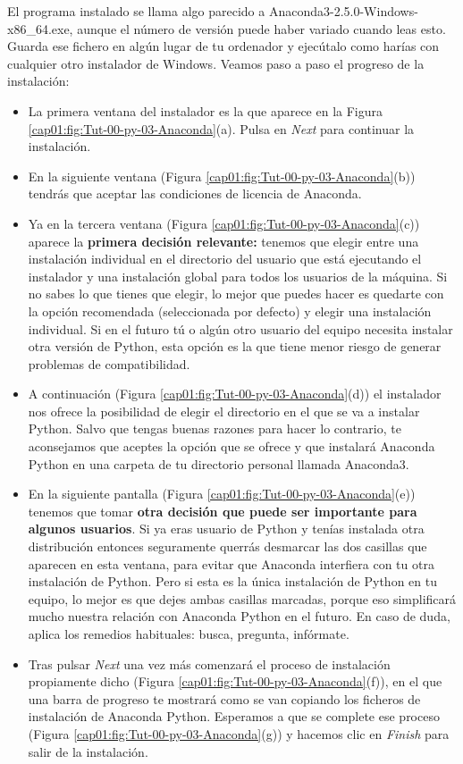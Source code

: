 \documentclass[10pt,a4paper]{article}\usepackage[]{graphicx}\usepackage[]{color}
\newcounter {cont01}
\begin{document}
El programa instalado se llama algo parecido a {\sf Anaconda3-2.5.0-Windows-x86\_64.exe}, aunque el número de versión puede haber variado cuando leas esto. Guarda ese fichero en algún lugar de tu ordenador y ejecútalo como harías con cualquier otro instalador de Windows. Veamos paso a paso el progreso de la instalación: 
\begin{itemize}
  \item La primera ventana del instalador es la que aparece en la Figura \ref{cap01:fig:Tut-00-py-03-Anaconda}(a). Pulsa en {\em Next} para continuar la instalación.
  \item En la siguiente ventana (Figura \ref{cap01:fig:Tut-00-py-03-Anaconda}(b)) tendrás que aceptar las condiciones de licencia de Anaconda.
  \item Ya en la tercera ventana (Figura \ref{cap01:fig:Tut-00-py-03-Anaconda}(c)) aparece la {\bf primera decisión relevante:} tenemos que elegir entre una instalación individual en el directorio del usuario que está ejecutando el instalador y una instalación global para todos los usuarios de la máquina. Si no sabes lo que tienes que elegir, lo mejor que puedes hacer es quedarte con la opción recomendada (seleccionada por defecto) y elegir una instalación individual. Si en el futuro tú o algún otro usuario del equipo necesita instalar otra versión de Python, esta opción es la que tiene menor riesgo de generar problemas de compatibilidad.
  \item A continuación (Figura \ref{cap01:fig:Tut-00-py-03-Anaconda}(d)) el instalador nos ofrece la posibilidad de elegir el directorio en el que se va a instalar Python. Salvo que tengas buenas razones para hacer lo contrario, te aconsejamos que aceptes la opción que se ofrece y que instalará Anaconda Python en una carpeta de tu directorio personal llamada {\sf Anaconda3}.
  \item En la siguiente pantalla (Figura \ref{cap01:fig:Tut-00-py-03-Anaconda}(e)) tenemos que tomar {\bf otra decisión que puede ser importante para algunos usuarios}. Si ya eras usuario de Python y tenías instalada otra distribución entonces seguramente querrás desmarcar las dos casillas que aparecen en esta ventana, para evitar que Anaconda interfiera con tu otra instalación de Python. Pero si esta es la única instalación de Python en tu equipo, lo mejor es que dejes ambas casillas marcadas, porque eso simplificará mucho nuestra relación con Anaconda Python en el futuro. En caso de duda, aplica los remedios habituales: busca, pregunta, infórmate.
  \item Tras pulsar {\em Next} una vez más comenzará el proceso de instalación propiamente dicho (Figura \ref{cap01:fig:Tut-00-py-03-Anaconda}(f)), en el que una barra de progreso te mostrará como se van copiando los ficheros de instalación de Anaconda Python. Esperamos a que se complete ese proceso (Figura \ref{cap01:fig:Tut-00-py-03-Anaconda}(g)) y hacemos clic en {\em Finish} para salir de la instalación.
\end{itemize}
\end{document}
